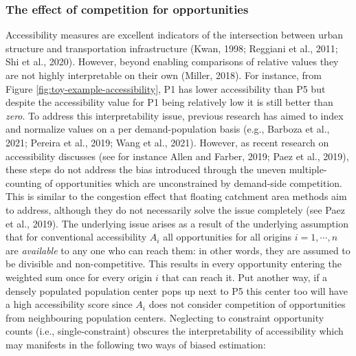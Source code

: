 \documentclass[]{elsarticle} %
\begin{document}
\hypertarget{the-effect-of-competition-for-opportunities}{%
\subsubsection{The effect of competition for
opportunities}\label{the-effect-of-competition-for-opportunities}}

Accessibility measures are excellent indicators of the intersection
between urban structure and transportation infrastructure (Kwan, 1998;
Reggiani et al., 2011; Shi et al., 2020). However, beyond enabling
comparisons of relative values they are not highly interpretable on
their own (Miller, 2018). For instance, from Figure
\ref{fig:toy-example-accessibility}, P1 has lower accessibility than P5
but despite the accessibility value for P1 being relatively low it is
still better than \emph{zero}. To address this interpretability issue,
previous research has aimed to index and normalize values on a per
demand-population basis (e.g., Barboza et al., 2021; Pereira et al.,
2019; Wang et al., 2021). However, as recent research on accessibility
discusses (see for instance Allen and Farber, 2019; Paez et al., 2019),
these steps do not address the bias introduced through the uneven
multiple-counting of opportunities which are unconstrained by
demand-side competition. This is similar to the congestion effect that
floating catchment area methods aim to address, although they do not
necessarily solve the issue completely (see Paez et al., 2019). The
underlying issue arises as a result of the underlying assumption that
for conventional accessibility \(A_i\) all opportunities for all origins
\(i=1,\cdots,n\) are \emph{available} to any one who can reach them: in
other words, they are assumed to be divisible and non-competitive. This
results in every opportunity entering the weighted sum once for every
origin \(i\) that can reach it. Put another way, if a densely populated
population center pops up next to P5 this center too will have a high
accessibility score since \(A_i\) does not consider competition of
opportunities from neighbouring population centers. Neglecting to
constraint opportunity counts (i.e., single-constraint) obscures the
interpretability of accessibility which may manifests in the following
two ways of biased estimation:
\end{document}
